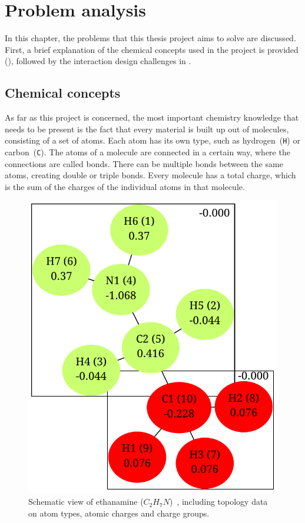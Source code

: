 \chapter{Problem analysis}


In this chapter, the problems that this thesis project aims to solve are discussed. First, a brief explanation of the chemical concepts used in the project is provided (), followed by the interaction design challenges in .

\section{Chemical concepts}
As far as this project is concerned, the most important chemistry knowledge that needs to be present is the fact that every material is built up out of molecules, consisting of a set of atoms. Each atom has its own type, such as hydrogen~(\verb|H|) or carbon~(\verb|C|). The atoms of a molecule are connected in a certain way, where the connections are called bonds. There can be multiple bonds between the same atoms, creating double or triple bonds. Every molecule has a total charge, which is the sum of the charges of the individual atoms in that molecule.

\begin{figure}
\vspace{-2em}
\begin{center}
\includegraphics[width=.38\textwidth]{img/ethanamine.pdf}
\caption{Schematic view of ethanamine ($C_{2}H_{7}N$)~\cite{atb2014ethanamine}, including topology data on atom types, atomic charges and charge groups.}
\end{center}
\vspace{-2em}
\end{figure}

